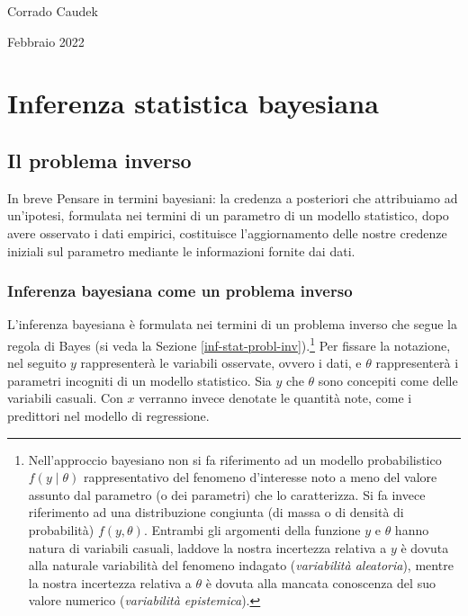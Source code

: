 \documentclass[
  11pt,
  italian,
  a4paper,
  extrafontsizes,onecolumn,openright
  ]{memoir}
\newenvironment{Summary}
  {\begin{bclogo}[logo=\bctrombone, noborder=true, couleur=lightgray!50]{In breve}\parindent0pt}
  {\end{bclogo}}
\begin{document}
\bigskip

Corrado Caudek

\bigskip

Febbraio 2022

\mainmatter

\hypertarget{part-inferenza-statistica-bayesiana}{%
\part*{Inferenza statistica bayesiana}\label{part-inferenza-statistica-bayesiana}}

\hypertarget{chapter-intro-bayes-inference}{%
\chapter{Il problema inverso}\label{chapter-intro-bayes-inference}}

\begin{Summary}
Pensare in termini bayesiani: la credenza a posteriori che attribuiamo
ad un'ipotesi, formulata nei termini di un parametro di un modello
statistico, dopo avere osservato i dati empirici, costituisce
l'aggiornamento delle nostre credenze iniziali sul parametro mediante le
informazioni fornite dai dati.
\end{Summary}

\hypertarget{inferenza-bayesiana-come-un-problema-inverso}{%
\section{Inferenza bayesiana come un problema inverso}\label{inferenza-bayesiana-come-un-problema-inverso}}

L'inferenza bayesiana è formulata nei termini di un problema inverso che segue la regola di Bayes (si veda la Sezione \ref{inf-stat-probl-inv}).\footnote{Nell'approccio bayesiano non si fa riferimento ad un modello probabilistico \(f(y \mid \theta)\) rappresentativo del fenomeno d'interesse noto a meno del valore assunto dal parametro (o dei parametri) che lo caratterizza. Si fa invece riferimento ad una distribuzione congiunta (di massa o di densità di probabilità) \(f(y, \theta)\). Entrambi gli argomenti della funzione \(y\) e \(\theta\) hanno natura di variabili casuali, laddove la nostra incertezza relativa a \(y\) è dovuta alla naturale variabilità del fenomeno indagato (\emph{variabilità aleatoria}), mentre la nostra incertezza relativa a \(\theta\) è dovuta alla mancata conoscenza del suo valore numerico (\emph{variabilità epistemica}).} Per fissare la notazione, nel seguito \(y\) rappresenterà le variabili osservate, ovvero i dati, e \(\theta\) rappresenterà i parametri incogniti di un modello statistico. Sia \(y\) che \(\theta\) sono concepiti come delle variabili casuali. Con \(x\) verranno invece denotate le quantità note, come i predittori nel modello di regressione.
\end{document}

